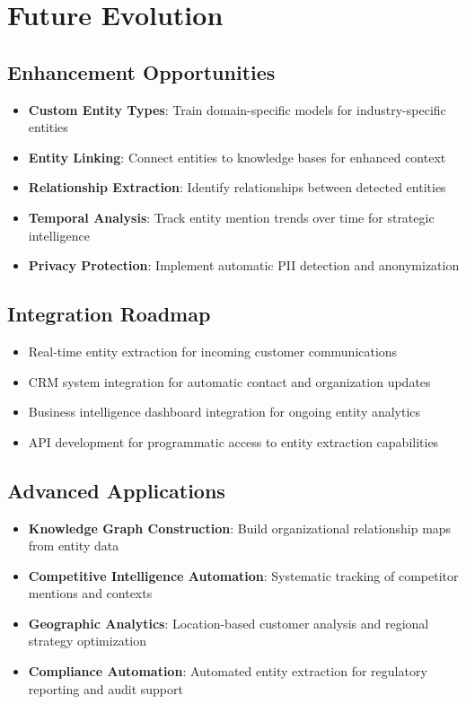 \documentclass[11pt]{article}
\begin{document}
\section{Future Evolution}

\subsection{Enhancement Opportunities}
\begin{itemize}
\item \textbf{Custom Entity Types}: Train domain-specific models for industry-specific entities
\item \textbf{Entity Linking}: Connect entities to knowledge bases for enhanced context
\item \textbf{Relationship Extraction}: Identify relationships between detected entities
\item \textbf{Temporal Analysis}: Track entity mention trends over time for strategic intelligence
\item \textbf{Privacy Protection}: Implement automatic PII detection and anonymization
\end{itemize}

\subsection{Integration Roadmap}
\begin{itemize}
\item Real-time entity extraction for incoming customer communications
\item CRM system integration for automatic contact and organization updates
\item Business intelligence dashboard integration for ongoing entity analytics
\item API development for programmatic access to entity extraction capabilities
\end{itemize}

\subsection{Advanced Applications}
\begin{itemize}
\item \textbf{Knowledge Graph Construction}: Build organizational relationship maps from entity data
\item \textbf{Competitive Intelligence Automation}: Systematic tracking of competitor mentions and contexts
\item \textbf{Geographic Analytics}: Location-based customer analysis and regional strategy optimization
\item \textbf{Compliance Automation}: Automated entity extraction for regulatory reporting and audit support
\end{itemize}
\end{document}
